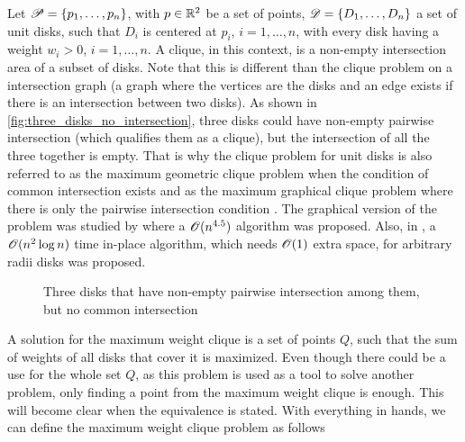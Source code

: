 Let $\mathscr{P}=\{p_1,\dots,p_n\}$, with $p\in \mathbb{R}^2$ be a set of points, $\mathscr{D}=\{D_1,\dots,D_n\}$ a set of unit disks, such that $D_i$ is centered at $p_i$, $i=1,\dots,n$, with every disk having a weight $w_i > 0$, $i=1,\dots,n$. A clique, in this context, is a non-empty intersection area of a subset of disks. Note that this is different than the clique problem on a intersection graph (a graph where the vertices are the disks and an edge exists if there is an intersection between two disks). As shown in \autoref{fig:three_disks_no_intersection}, three disks could have non-empty pairwise intersection (which qualifies them as a clique), but the intersection of all the three together is empty. That is why the clique problem for unit disks is also referred to as the maximum geometric clique problem when the condition of common intersection exists and as the maximum graphical clique problem where there is only the pairwise intersection condition \cite{inplace:2014}. The graphical version of the problem was studied by \cite{graphical-clique} where a $\mathscr{O}(n^{4.5})$ algorithm was proposed. Also, in \cite{inplace:2014}, a $\mathscr{O}(n^2\log{n})$ time in-place algorithm, which needs $\mathscr{O}(1)$ extra space, for arbitrary radii disks was proposed.

\begin{figure}[H]
\centering

    \caption{Three disks that have non-empty pairwise intersection among them, but no common intersection}
    \label{fig:three_disks_no_intersection}
    \fautor
\end{figure}


A solution for the maximum weight clique is a set of points $Q$, such that the sum of weights of all disks that cover it is maximized. Even though there could be a use for the whole set $Q$, as this problem is used as a tool to solve another problem, only finding a point from the maximum weight clique is enough. This will become clear when the equivalence is stated. With everything in hands, we can define the maximum weight clique problem as follows

